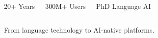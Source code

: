 {\begin{columns}[T,onlytextwidth]
\SBMetric{\linewidth}
{20+}
{Years}

\SBMetric{\linewidth}
{300M+}
{Users}

\SBMetric{\linewidth}
{PhD}
{Language AI}

\end{columns}

\vspace{0.35cm}

\begin{center}
{\SBFontBody\fontsize{9}{11}\selectfont\color{SBGray}
From language technology to AI-native platforms.
}
\end{center}

}